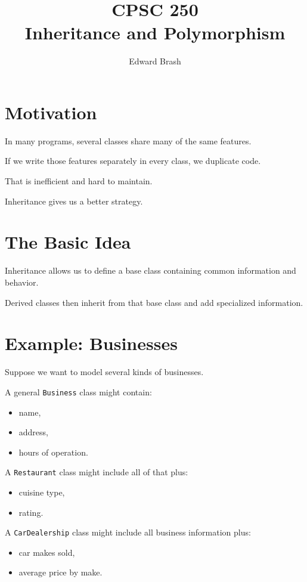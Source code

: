 \documentclass[11pt]{article}
\title{CPSC 250 \\ Inheritance and Polymorphism}
\author{Edward Brash}
\date{}
\begin{document}
\maketitle

\section{Motivation}

In many programs, several classes share many of the same features.

If we write those features separately in every class, we duplicate code.

That is inefficient and hard to maintain.

Inheritance gives us a better strategy.

\section{The Basic Idea}

Inheritance allows us to define a base class containing common information and behavior.

Derived classes then inherit from that base class and add specialized information.

\section{Example: Businesses}

Suppose we want to model several kinds of businesses.

A general \texttt{Business} class might contain:

\begin{itemize}
    \item name,
    \item address,
    \item hours of operation.
\end{itemize}

A \texttt{Restaurant} class might include all of that plus:

\begin{itemize}
    \item cuisine type,
    \item rating.
\end{itemize}

A \texttt{CarDealership} class might include all business information plus:

\begin{itemize}
    \item car makes sold,
    \item average price by make.
\end{itemize}
\end{document}
